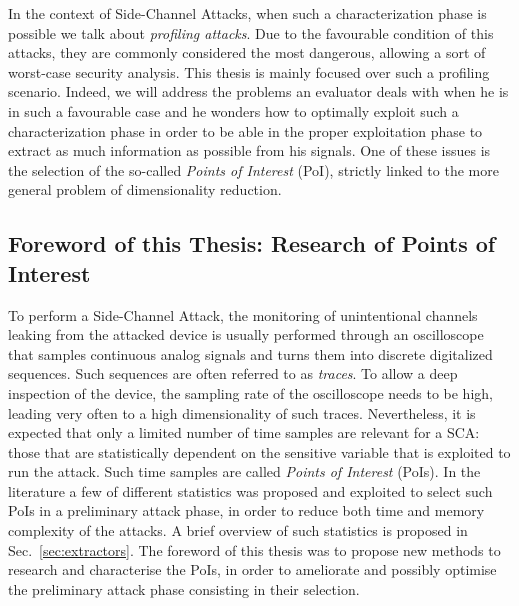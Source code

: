 In the context of Side-Channel Attacks, when such a characterization phase is possible we talk about \emph{profiling attacks}. Due to the favourable condition of this attacks, they are commonly considered the most dangerous, allowing a sort of worst-case security analysis. This thesis is mainly focused over such a profiling scenario. Indeed, we will address the problems an evaluator deals with when he is in such a favourable case and he wonders how to optimally exploit such a characterization phase in order to be able in the proper exploitation phase to extract as much information as possible from his signals. One of these issues is the selection of the so-called \emph{Points of Interest} (PoI), strictly linked to the more general problem of dimensionality reduction.

\subsection{Foreword of this Thesis: Research of Points of Interest}
To perform a Side-Channel Attack, the monitoring of unintentional channels leaking from the attacked device is usually performed through an oscilloscope that samples continuous analog signals and turns them into discrete digitalized sequences. Such sequences are often referred to as \emph{traces}. To allow a deep inspection of the device, the sampling rate of the oscilloscope needs to be high, leading very often to a high dimensionality of such traces. Nevertheless,  it is expected that only a limited number of time samples are relevant for a SCA: those that are statistically dependent on the sensitive variable that is exploited to run the attack. Such time samples are called \emph{Points of Interest} (PoIs). In the literature a few of different statistics was proposed and exploited to select such PoIs in a preliminary attack phase, in order to reduce both time and memory complexity of the attacks. A brief overview of such statistics is proposed in Sec.~\ref{sec:extractors}. The foreword of this thesis was to propose new methods to research and characterise the PoIs, in order to ameliorate and possibly optimise the preliminary attack phase consisting in their selection. 

